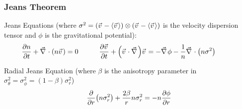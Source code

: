 		\subsubsection{Jeans Theorem}
			Jeans Equations (where $\sigma^2 = \qty(\vec{v}-\avg{\vec{v}})\otimes\qty(\vec{v}-\avg{\vec{v}})$ is the velocity dispersion tensor and $\phi$ is the gravitational potential):
			\begin{equation}
				\pdv{n}{t} + \Nabla\cdot\qty(n\vec{v}) = 0 \hsp
				\pdv{\vec{v}}{t} + \qty(\vec{v}\cdot\Nabla)\vec{v} = -\Nabla\phi -\frac{1}{n}\Nabla\cdot\qty(n\sigma^2) \hsp
			\end{equation}

			\noindent
			Radial Jeans Equation (where $\beta$ is the anisotropy parameter in $\sigma_\theta^2 = \sigma_\phi^2 = (1-\beta) \sigma_r^2$)
			\begin{equation}
				\pdv{r} \qty(n\sigma_r^2) + \frac{2\beta}{r} n\sigma_r^2 = -n\pdv{\phi}{r}
			\end{equation}
			